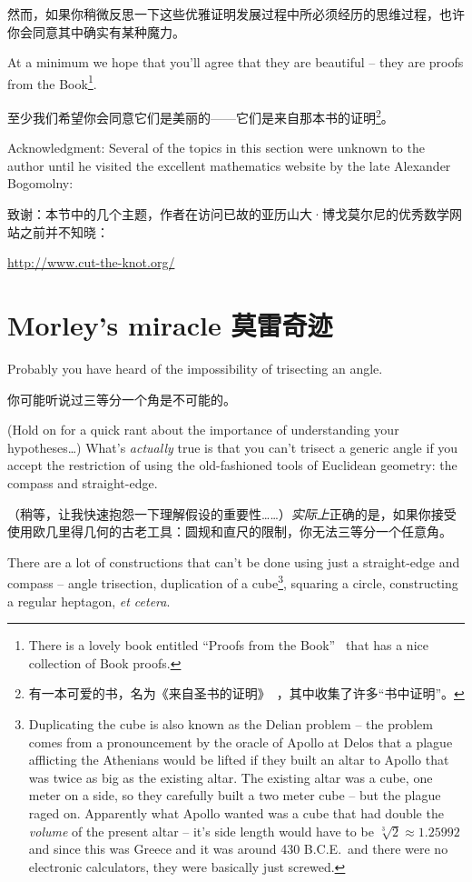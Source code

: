 然而，如果你稍微反思一下这些优雅证明发展过程中所必须经历的思维过程，也许你会同意其中确实有某种魔力。

At a minimum
we hope that you'll agree that they are beautiful -- they are proofs
from the Book\footnote{There is a lovely book entitled ``Proofs from the
Book''~\cite{pftB} that has a nice collection of Book proofs.}.

至少我们希望你会同意它们是美丽的——它们是来自那本书的证明\footnote{有一本可爱的书，名为《来自圣书的证明》~\cite{pftB}，其中收集了许多“书中证明”。}。

Acknowledgment: Several of the topics in this section were unknown to
the author until he visited the excellent mathematics website
by the late Alexander Bogomolny:

致谢：本节中的几个主题，作者在访问已故的亚历山大·博戈莫尔尼的优秀数学网站之前并不知晓：

\url{http://www.cut-the-knot.org/}

\clearpage

\section{Morley's miracle 莫雷奇迹}
\label{sec:morley}

Probably you have heard of the impossibility of trisecting an angle.

你可能听说过三等分一个角是不可能的。

(Hold on for a quick rant about the importance of understanding your
hypotheses\ldots)  What's \emph{actually} true is that you can't trisect
a generic angle if you accept the restriction of using the old-fashioned
tools of Euclidean geometry: the compass and straight-edge.

（稍等，让我快速抱怨一下理解假设的重要性……）\emph{实际上}正确的是，如果你接受使用欧几里得几何的古老工具：圆规和直尺的限制，你无法三等分一个任意角。

There 
are a lot of constructions that can't be done using just a 
straight-edge and compass
-- angle trisection, duplication of a cube\footnote{Duplicating the cube 
is also known as the Delian problem -- the problem comes from a pronouncement
by the oracle of Apollo at Delos that a plague afflicting the Athenians would
be lifted if they built an altar to Apollo that was twice as big as the 
existing altar. The existing altar was a cube, one meter on a side, so they
carefully built a two meter cube -- but the plague raged on. Apparently what
Apollo wanted was a cube that had double the \emph{volume} of the 
present altar -- it's side length would have to be 
$\sqrt[3]{2} \approx 1.25992$ and since this was Greece and it was around 
430 B.C.E.\ and there were no electronic calculators, they were basically
just screwed.}, squaring a circle, constructing a regular heptagon, \emph{et cetera}.


